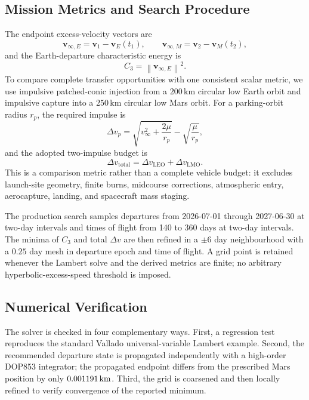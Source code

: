 \documentclass[11pt,a4paper]{article}
\newcommand{\vect}[1]{\bm{#1}}
\newcommand{\norm}[1]{\left\lVert#1\right\rVert}
\begin{document}
\subsection{Mission Metrics and Search Procedure}
\label{sec:mission-metrics}

The endpoint excess-velocity vectors are
\begin{equation}
  \vect v_{\infty,E}=\vect v_1-\vect v_E(t_1),
  \qquad
  \vect v_{\infty,M}=\vect v_2-\vect v_M(t_2),
\end{equation}
and the Earth-departure characteristic energy is
\begin{equation}
  C_3=\norm{\vect v_{\infty,E}}^2.
\end{equation}
To compare complete transfer opportunities with one consistent scalar metric,
we use impulsive patched-conic injection from a $200\,\mathrm{km}$ circular
low Earth orbit and impulsive capture into a $250\,\mathrm{km}$ circular low
Mars orbit. For a parking-orbit radius $r_p$, the required impulse is
\begin{equation}
  \Delta v_p=
  \sqrt{v_\infty^2+\frac{2\mu}{r_p}}
  -\sqrt{\frac{\mu}{r_p}},
\end{equation}
and the adopted two-impulse budget is
\begin{equation}
  \Delta v_{\mathrm{total}}
  =\Delta v_{\mathrm{LEO}}+\Delta v_{\mathrm{LMO}}.
  \label{eq:patched-total}
\end{equation}
This is a comparison metric rather than a complete vehicle budget: it excludes
launch-site geometry, finite burns, midcourse corrections, atmospheric entry,
aerocapture, landing, and spacecraft mass staging.

The production search samples departures from 2026-07-01 through 2027-06-30
at two-day intervals and times of flight from 140 to 360 days at two-day
intervals. The minima of $C_3$ and total $\Delta v$ are then refined in a
$\pm6$ day neighbourhood with a $0.25$ day mesh in departure epoch and time of
flight. A grid point is retained whenever the Lambert solve and the derived
metrics are finite; no arbitrary hyperbolic-excess-speed threshold is imposed.

\subsection{Numerical Verification}
\label{sec:q3-verification}

The solver is checked in four complementary ways. First, a regression test
reproduces the standard Vallado universal-variable Lambert example. Second,
the recommended departure state is propagated independently with a high-order
DOP853 integrator; the propagated endpoint differs from the prescribed Mars
position by only $0.001191\,\mathrm{km}$. Third, the grid is
coarsened and then locally refined to verify convergence of the reported
minimum.
\end{document}
